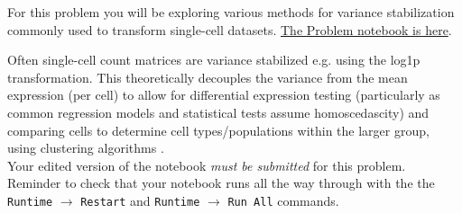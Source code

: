 \documentclass[11pt]{exam}
\begin{document}
\begin{questions}

\newpage
\question[40] For this problem you will be exploring various methods for variance stabilization commonly used to transform single-cell datasets. \href{https://github.com/pachterlab/BI-BE-CS-183-2023/blob/main/HW6/Problem3.ipynb}{The Problem  notebook is here}.

   Often single-cell count matrices are variance stabilized e.g. using the log1p transformation. This theoretically decouples the variance from the mean expression (per cell) to allow for differential expression testing (particularly as common regression models and statistical tests assume homoscedascity) and comparing cells to determine cell types/populations within the larger group, using clustering algorithms \cite{Svensson2017-av}. \\

    Your edited version of the notebook \textit{must be submitted } for this problem. Reminder to check that your notebook runs all the way through with the the {\tt Runtime} $\xrightarrow{}$ {\tt Restart} and {\tt Runtime} $\xrightarrow{}$ {\tt Run All} commands.
  
  


  \end{questions}


\printbibliography
\end{document}
